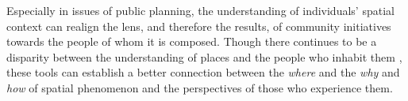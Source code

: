 Especially in issues of public planning, the understanding of individuals' spatial context can realign the lens, and therefore the results, of community initiatives towards the people of whom it is composed. %
Though there continues to be a disparity between the understanding of places and the people who inhabit them\cite{Acedo2019}%
, these tools can establish a better connection between the \textit{where} and the \textit{why} and \textit{how} of spatial phenomenon and the perspectives of those who experience them\cite{Painho2013}.%

